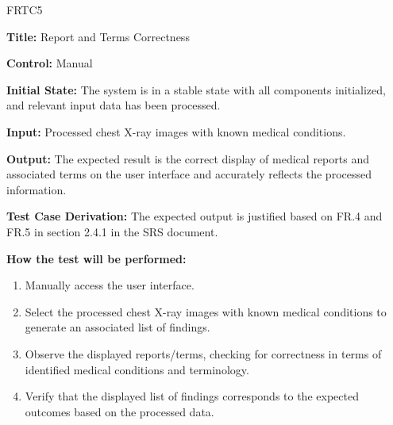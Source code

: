 \documentclass[12pt, titlepage]{article}
\begin{document}
\begin{itemize}
    \begin{item}
        FRTC5
        \begin{mdframed}[linewidth=0.5mm]
            \textbf{Title:} Report and Terms Correctness \par
            \textbf{Control:} Manual \par
            \textbf{Initial State:} The system is in a stable state with all components initialized, and relevant input data has been processed. \par
            \textbf{Input:} Processed chest X-ray images with known medical conditions. \par
            \textbf{Output:} The expected result is the correct display of medical reports and associated terms on the user interface and accurately reflects the processed information. \par
            \textbf{Test Case Derivation:} The expected output is justified based on FR.4 and FR.5 in section 2.4.1 in the SRS document. \par
            \textbf{How the test will be performed:}
            \begin{enumerate} [noitemsep]
                \item Manually access the user interface.
                \item Select the processed chest X-ray images with known medical conditions to generate an associated list of findings.
                \item Observe the displayed reports/terms, checking for correctness in terms of identified medical conditions and terminology.
                \item Verify that the displayed list of findings corresponds to the expected outcomes based on the processed data.
            \end{enumerate}
        \end{mdframed} 
    \end{item}
\end{itemize}
\end{document}
